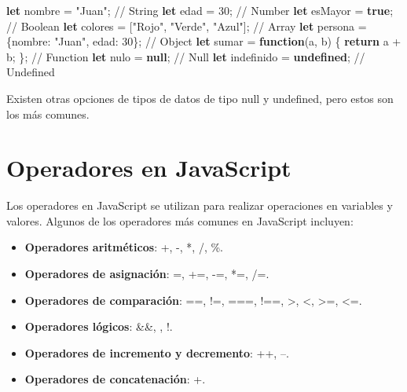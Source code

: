 \documentclass[
  a4paper,
  DIV=11,
  numbers=noendperiod,
  onepage,
  openany]{scrreprt}
\newenvironment{Shaded}{\begin{snugshade}}{\end{snugshade}}
\newcommand{\CommentTok}[1]{\textcolor[rgb]{0.37,0.37,0.37}{#1}}
\newcommand{\ControlFlowTok}[1]{\textcolor[rgb]{0.00,0.23,0.31}{\textbf{#1}}}
\newcommand{\DataTypeTok}[1]{\textcolor[rgb]{0.68,0.00,0.00}{#1}}
\newcommand{\DecValTok}[1]{\textcolor[rgb]{0.68,0.00,0.00}{#1}}
\newcommand{\KeywordTok}[1]{\textcolor[rgb]{0.00,0.23,0.31}{\textbf{#1}}}
\newcommand{\NormalTok}[1]{\textcolor[rgb]{0.00,0.23,0.31}{#1}}
\newcommand{\OperatorTok}[1]{\textcolor[rgb]{0.37,0.37,0.37}{#1}}
\newcommand{\StringTok}[1]{\textcolor[rgb]{0.13,0.47,0.30}{#1}}
\providecommand{\tightlist}{%
  \setlength{\itemsep}{0pt}\setlength{\parskip}{0pt}}\usepackage{longtable,booktabs,array}
\begin{document}
\begin{tcolorbox}
\begin{Shaded}
\begin{Highlighting}[]
\KeywordTok{let}\NormalTok{ nombre }\OperatorTok{=} \StringTok{"Juan"}\OperatorTok{;} \CommentTok{// String}
\KeywordTok{let}\NormalTok{ edad }\OperatorTok{=} \DecValTok{30}\OperatorTok{;} \CommentTok{// Number}
\KeywordTok{let}\NormalTok{ esMayor }\OperatorTok{=} \KeywordTok{true}\OperatorTok{;} \CommentTok{// Boolean}
\KeywordTok{let}\NormalTok{ colores }\OperatorTok{=}\NormalTok{ [}\StringTok{"Rojo"}\OperatorTok{,} \StringTok{"Verde"}\OperatorTok{,} \StringTok{"Azul"}\NormalTok{]}\OperatorTok{;} \CommentTok{// Array}
\KeywordTok{let}\NormalTok{ persona }\OperatorTok{=}\NormalTok{ \{}\DataTypeTok{nombre}\OperatorTok{:} \StringTok{"Juan"}\OperatorTok{,} \DataTypeTok{edad}\OperatorTok{:} \DecValTok{30}\NormalTok{\}}\OperatorTok{;} \CommentTok{// Object}
\KeywordTok{let}\NormalTok{ sumar }\OperatorTok{=} \KeywordTok{function}\NormalTok{(a}\OperatorTok{,}\NormalTok{ b) \{ }\ControlFlowTok{return}\NormalTok{ a }\OperatorTok{+}\NormalTok{ b}\OperatorTok{;}\NormalTok{ \}}\OperatorTok{;} \CommentTok{// Function}
\KeywordTok{let}\NormalTok{ nulo }\OperatorTok{=} \KeywordTok{null}\OperatorTok{;} \CommentTok{// Null}
\KeywordTok{let}\NormalTok{ indefinido }\OperatorTok{=} \KeywordTok{undefined}\OperatorTok{;} \CommentTok{// Undefined}
\end{Highlighting}
\end{Shaded}

Existen otras opciones de tipos de datos de tipo null y undefined, pero
estos son los más comunes.

\section{Operadores en JavaScript}\label{operadores-en-javascript}

Los operadores en JavaScript se utilizan para realizar operaciones en
variables y valores. Algunos de los operadores más comunes en JavaScript
incluyen:

\begin{itemize}
\tightlist
\item
  \textbf{Operadores aritméticos}: +, -, *, /, \%.
\item
  \textbf{Operadores de asignación}: =, +=, -=, *=, /=.
\item
  \textbf{Operadores de comparación}: ==, !=, ===, !==, \textgreater,
  \textless, \textgreater=, \textless=.
\item
  \textbf{Operadores lógicos}: \&\&, \textbar\textbar, !.
\item
  \textbf{Operadores de incremento y decremento}: ++, --.
\item
  \textbf{Operadores de concatenación}: +.
\end{itemize}


\end{tcolorbox}
\end{document}
